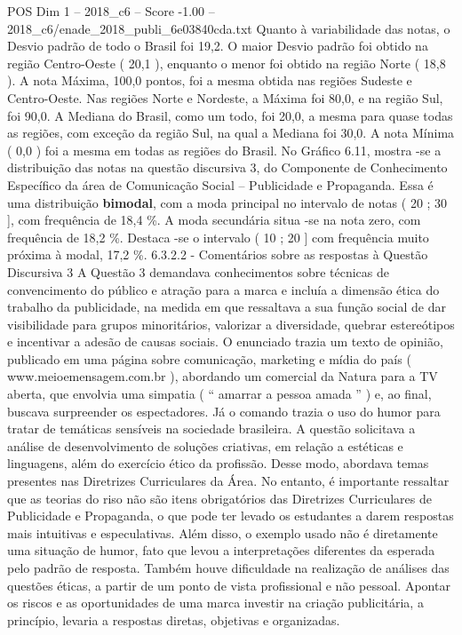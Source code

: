\begin{textsample}{POS Dim 1 – 2018\_c6 – Score -1.00 – 2018\_c6/enade\_2018\_publi\_6e03840cda.txt}
Quanto à variabilidade das notas, o Desvio padrão de todo o Brasil foi 19,2.
O maior Desvio padrão foi obtido na região Centro-Oeste ( 20,1 ), enquanto o menor foi obtido na região Norte ( 18,8 ).
A nota Máxima, 100,0 pontos, foi a mesma obtida nas regiões Sudeste e Centro-Oeste.
Nas regiões Norte e Nordeste, a Máxima foi 80,0, e na região Sul, foi 90,0.
A Mediana do Brasil, como um todo, foi 20,0, a mesma para quase todas as regiões, com exceção da região Sul, na qual a Mediana foi 30,0.
A nota Mínima ( 0,0 ) foi a mesma em todas as regiões do Brasil.
No Gráfico 6.11, mostra -se a distribuição das notas na questão discursiva 3, do Componente de Conhecimento Específico da área de Comunicação Social – Publicidade e Propaganda.
Essa é uma distribuição \textbf{bimodal}, com a moda principal no intervalo de notas ( 20 ; 30 ], com frequência de 18,4 \%.
A moda secundária situa -se na nota zero, com frequência de 18,2 \%.
Destaca -se o intervalo ( 10 ; 20 ] com frequência muito próxima à modal, 17,2 \%. 6.3.2.2 - Comentários sobre as respostas à Questão Discursiva 3 A Questão 3 demandava conhecimentos sobre técnicas de convencimento do público e atração para a marca e incluía a dimensão ética do trabalho da publicidade, na medida em que ressaltava a sua função social de dar visibilidade para grupos minoritários, valorizar a diversidade, quebrar estereótipos e incentivar a adesão de causas sociais.
O enunciado trazia um texto de opinião, publicado em uma página sobre comunicação, marketing e mídia do país ( www.meioemensagem.com.br ), abordando um comercial da Natura para a TV aberta, que envolvia uma simpatia ( “ amarrar a pessoa amada ” ) e, ao final, buscava surpreender os espectadores.
Já o comando trazia o uso do humor para tratar de temáticas sensíveis na sociedade brasileira.
A questão solicitava a análise de desenvolvimento de soluções criativas, em relação a estéticas e linguagens, além do exercício ético da profissão.
Desse modo, abordava temas presentes nas Diretrizes Curriculares da Área.
No entanto, é importante ressaltar que as teorias do riso não são itens obrigatórios das Diretrizes Curriculares de Publicidade e Propaganda, o que pode ter levado os estudantes a darem respostas mais intuitivas e especulativas.
Além disso, o exemplo usado não é diretamente uma situação de humor, fato que levou a interpretações diferentes da esperada pelo padrão de resposta.
Também houve dificuldade na realização de análises das questões éticas, a partir de um ponto de vista profissional e não pessoal.
Apontar os riscos e as oportunidades de uma marca investir na criação publicitária, a princípio, levaria a respostas diretas, objetivas e organizadas.

\end{textsample}
